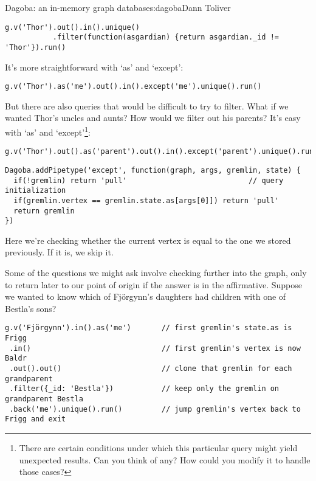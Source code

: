 \begin{aosachapter}{Dagoba: an in-memory graph database}{s:dagoba}{Dann Toliver}
\begin{verbatim}
g.v('Thor').out().in().unique()
           .filter(function(asgardian) {return asgardian._id != 'Thor'}).run()
\end{verbatim}

It's more straightforward with `as' and `except':

\begin{verbatim}
g.v('Thor').as('me').out().in().except('me').unique().run()
\end{verbatim}

But there are also queries that would be difficult to try to filter.
What if we wanted Thor's uncles and aunts? How would we filter out his
parents? It's easy with `as' and `except'\footnote{There are certain
  conditions under which this particular query might yield unexpected
  results. Can you think of any? How could you modify it to handle those
  cases?}:

\begin{verbatim}
g.v('Thor').out().as('parent').out().in().except('parent').unique().run()
\end{verbatim}

\begin{verbatim}
Dagoba.addPipetype('except', function(graph, args, gremlin, state) {
  if(!gremlin) return 'pull'                            // query initialization
  if(gremlin.vertex == gremlin.state.as[args[0]]) return 'pull'
  return gremlin
})
\end{verbatim}

Here we're checking whether the current vertex is equal to the one we
stored previously. If it is, we skip it.

\label{back}

Some of the questions we might ask involve checking further into the
graph, only to return later to our point of origin if the answer is in
the affirmative. Suppose we wanted to know which of Fjörgynn's daughters
had children with one of Bestla's sons?

\begin{verbatim}
g.v('Fjörgynn').in().as('me')       // first gremlin's state.as is Frigg
 .in()                              // first gremlin's vertex is now Baldr
 .out().out()                       // clone that gremlin for each grandparent
 .filter({_id: 'Bestla'})           // keep only the gremlin on grandparent Bestla
 .back('me').unique().run()         // jump gremlin's vertex back to Frigg and exit
\end{verbatim}


\end{aosachapter}

